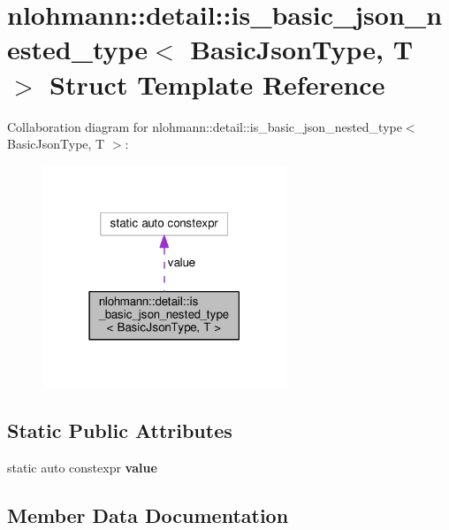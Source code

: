 \hypertarget{structnlohmann_1_1detail_1_1is__basic__json__nested__type}{}\section{nlohmann\+:\+:detail\+:\+:is\+\_\+basic\+\_\+json\+\_\+nested\+\_\+type$<$ Basic\+Json\+Type, T $>$ Struct Template Reference}
\label{structnlohmann_1_1detail_1_1is__basic__json__nested__type}


Collaboration diagram for nlohmann\+:\+:detail\+:\+:is\+\_\+basic\+\_\+json\+\_\+nested\+\_\+type$<$ Basic\+Json\+Type, T $>$\+:\nopagebreak
\begin{figure}[H]
\begin{center}
\leavevmode
\includegraphics[width=207pt]{structnlohmann_1_1detail_1_1is__basic__json__nested__type__coll__graph}
\end{center}
\end{figure}
\subsection*{Static Public Attributes}
\begin{DoxyCompactItemize}
\item 
static auto constexpr {\bfseries value}
\end{DoxyCompactItemize}


\subsection{Member Data Documentation}
